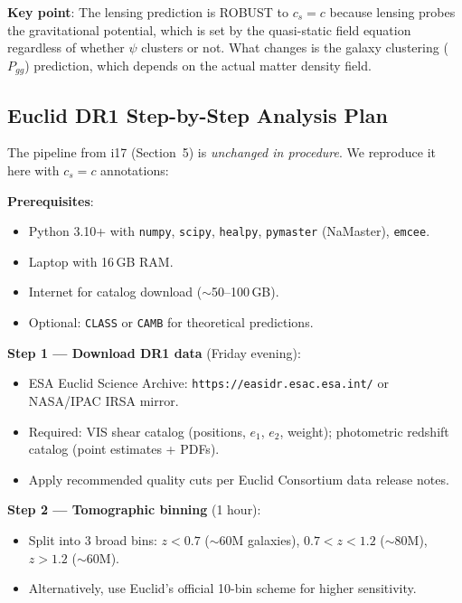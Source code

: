 \documentclass[11pt,a4paper]{article}
\begin{document}
\textbf{Key point}: The lensing prediction is ROBUST to $c_s = c$
because lensing probes the gravitational potential, which is set by
the quasi-static field equation regardless of whether $\psi$ clusters
or not. What changes is the galaxy clustering ($P_{gg}$) prediction,
which depends on the actual matter density field.

\subsection{Euclid DR1 Step-by-Step Analysis Plan}

The pipeline from i17 (Section~5) is \emph{unchanged in procedure}.
We reproduce it here with $c_s = c$ annotations:

\begin{pipelinebox}

\textbf{Prerequisites}:
\begin{itemize}[nosep]
\item Python 3.10+ with \texttt{numpy}, \texttt{scipy}, \texttt{healpy},
  \texttt{pymaster} (NaMaster), \texttt{emcee}.
\item Laptop with 16\,GB RAM.
\item Internet for catalog download ($\sim$50--100\,GB).
\item Optional: \texttt{CLASS} or \texttt{CAMB} for theoretical predictions.
\end{itemize}

\medskip
\textbf{Step 1 --- Download DR1 data} (Friday evening):
\begin{itemize}[nosep]
\item ESA Euclid Science Archive: \texttt{https://easidr.esac.esa.int/}
  or NASA/IPAC IRSA mirror.
\item Required: VIS shear catalog (positions, $e_1$, $e_2$, weight);
  photometric redshift catalog (point estimates + PDFs).
\item Apply recommended quality cuts per Euclid Consortium data release
  notes.
\end{itemize}

\textbf{Step 2 --- Tomographic binning} (1 hour):
\begin{itemize}[nosep]
\item Split into 3 broad bins: $z < 0.7$ ($\sim$60M galaxies),
  $0.7 < z < 1.2$ ($\sim$80M), $z > 1.2$ ($\sim$60M).
\item Alternatively, use Euclid's official 10-bin scheme for higher
  sensitivity.
\end{itemize}


\end{pipelinebox}
\end{document}
